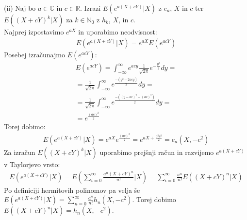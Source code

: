 \documentclass[letterpaper, titlepage, freqn]{article}
\begin{document}
(ii) Naj bo $a \in \mathbb{C}$ in $c \in \mathbb{R}$. Izrazi $E\left( e^{a\left(X+cY\right)}|X\right)$ z $e_a$, $X$ in $c$ ter $E\left(\left(X+cY\right)^{k}|X\right)$ za $k \in \mathbb{N}_0$ z $h_k$, $X$, in $c$. \\
 
Najprej izpostavimo $e^{aX}$ in uporabimo neodvisnost:
\begin{equation*}
\begin{aligned}
E\left( e^{a\left(X+cY\right)}|X\right)=e^{aX}E\left(e^{acY}\right)
\end{aligned}
\end{equation*}
Posebej izračunajmo $E\left(e^{acY}\right)$:
\begin{equation*}
\begin{aligned}
E\left(e^{acY}\right)=\int_{-\infty}^{\infty}e^{acy}\frac{1}{\sqrt{2\pi}} e^{-\frac{y^2}{2}} dy=\\
=\frac{1}{\sqrt{2\pi}}\int_{-\infty}^{\infty}e^{\frac{-\left(y^2-2acy\right)}{2}}dy=\\
=\frac{1}{\sqrt{2\pi}}\int_{-\infty}^{\infty}e^{\frac{-\left(\left(y-ac\right)^2-\left(ac\right)^2\right)}{2}}dy=\\
=e^\frac{(ac)^2}{2}
\end{aligned}
\end{equation*}
Torej dobimo:
\begin{equation*}
\begin{aligned}
E\left( e^{a\left(X+cY\right)}|X\right)=e^{aX}e^\frac{\left(ac\right)^2}{2}=e^{aX+\frac{a^2c^2}{2}}=e_a\left(X,-c^2\right)
\end{aligned}
\end{equation*}
Za izračun $E\left(\left(X+cY\right)^{k}|X\right)$ uporabimo prejšnji račun in razvijemo $e^{a\left(X+cY\right)}$ v Taylorjevo vrsto:
\begin{equation*}
\begin{aligned}
E\left( e^{a\left(X+cY\right)}|X\right)=E\left(\sum_{i=0}^{\infty}\frac{a^n\left(X+cY\right)^n}{n!}|X\right)=\sum_{i=0}^{\infty}\frac{a^n}{n!}E((X+cY)^n|X) 
\end{aligned}
\end{equation*}
Po definiciji hermitovih polinomov pa velja še $E\left( e^{a\left(X+cY\right)}|X\right)=
\sum_{n=0}^{\infty} \frac{a^n}{n!} h_n\left(X, -c^2\right)$.
Torej dobimo $E\left(\left(X+cY\right)^{n}|X\right)=h_n\left(X,-c^2\right)$.
\end{document}
